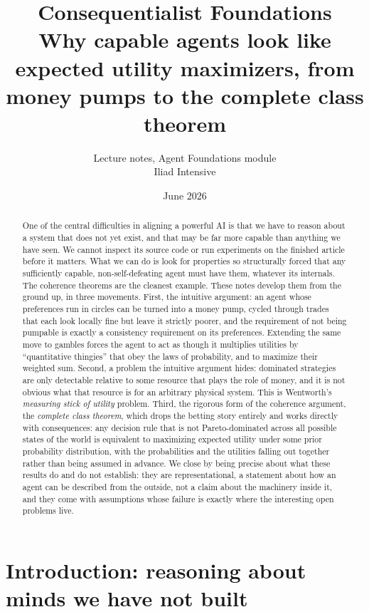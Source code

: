 \documentclass[10pt]{article}
\title{Consequentialist Foundations \\[1ex]
{\large Why capable agents look like expected utility maximizers, from money pumps to the complete class theorem}}
\author{Lecture notes, Agent Foundations module \\ Iliad Intensive}
\date{June 2026}
\theoremstyle{definition}
\theoremstyle{remark}
\begin{document}
\maketitle

\begin{abstract}
One of the central difficulties in aligning a powerful AI is that we have to reason about a system that does not yet exist, and that may be far more capable than anything we have seen. We cannot inspect its source code or run experiments on the finished article before it matters. What we can do is look for properties so structurally forced that any sufficiently capable, non-self-defeating agent must have them, whatever its internals. The coherence theorems are the cleanest example. These notes develop them from the ground up, in three movements. First, the intuitive argument: an agent whose preferences run in circles can be turned into a money pump, cycled through trades that each look locally fine but leave it strictly poorer, and the requirement of not being pumpable is exactly a consistency requirement on its preferences. Extending the same move to gambles forces the agent to act as though it multiplies utilities by ``quantitative thingies'' that obey the laws of probability, and to maximize their weighted sum. Second, a problem the intuitive argument hides: dominated strategies are only detectable relative to some resource that plays the role of money, and it is not obvious what that resource is for an arbitrary physical system. This is Wentworth's \emph{measuring stick of utility} problem. Third, the rigorous form of the coherence argument, the \emph{complete class theorem}, which drops the betting story entirely and works directly with consequences: any decision rule that is not Pareto-dominated across all possible states of the world is equivalent to maximizing expected utility under some prior probability distribution, with the probabilities and the utilities falling out together rather than being assumed in advance. We close by being precise about what these results do and do not establish: they are representational, a statement about how an agent can be described from the outside, not a claim about the machinery inside it, and they come with assumptions whose failure is exactly where the interesting open problems live.
\end{abstract}

\tableofcontents

\section{Introduction: reasoning about minds we have not built}
\label{sec:intro}
\end{document}
